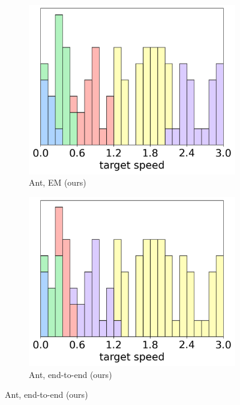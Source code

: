 \begin{figure}[t]
\begin{center}
    \begin{subfigure}{0.3\textwidth}
        \centering
        \caption{Ant, EM (ours)}
        \includegraphics[width=\linewidth]{pics/histograms/em/Ant.png}
    \end{subfigure}\hspace{10pt}%
    \begin{subfigure}{0.3\textwidth}
        \centering
        \caption{Ant, end-to-end (ours)}
        \includegraphics[width=\linewidth]{pics/histograms/end-to-end/Ant.png}

\end{subfigure}
\end{center}
\end{figure}
